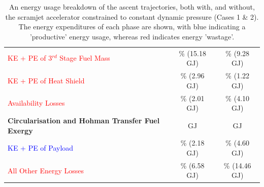 \begin{table}[!ht]
\begin{tabular}{l c c}
 		\textcolor{red}{KE + PE  of 3$^{rd}$ Stage Fuel Mass}  
 		& \WmFthreeConstqNoReturn \% (15.18 GJ) & \WmFthreeStandardNoReturn \% (9.28 GJ)
 		\\
 		\textcolor{red}{KE + PE of Heat Shield}  
 		& \WHSthreeConstqNoReturn \% (2.96 GJ) & \WHSthreeStandardNoReturn \% (1.22 GJ)
 		\\
 		\textcolor{red}{Availability Losses}   
 		& \PlossthreeConstqNoReturn \% (2.01 GJ) & \PlossthreeStandardNoReturn \% (4.10 GJ)
 		\\
 		\textbf{Circularisation and Hohman Transfer Fuel Exergy}  
 		& \textbf{\HTExergyConstqNoReturn}  GJ & \textbf{\HTExergyStandardNoReturn}  GJ
 		\\
 		\textcolor{blue}{KE + PE of Payload}  
 		& \HTeffConstqNoReturn \% (2.18 GJ) & \HTeffStandardNoReturn \% (4.60 GJ)
 		\\
 		\textcolor{red}{All Other Energy Losses}  
 		& \HTlossConstqNoReturn \% (6.58 GJ) & \HTlossStandardNoReturn \% (14.46 GJ)
 		\\
 		\hline 
 	\end{tabular} 
 	\caption{An energy usage breakdown of the ascent trajectories, both with, and without, the scramjet accelerator constrained to constant dynamic pressure (Cases 1 \& 2). The energy expenditures of each phase are shown, with blue indicating a 'productive' energy usage, whereas red indicates energy 'wastage'.}
 	\label{tab:effStandardNoReturn}
 \end{table}
 
